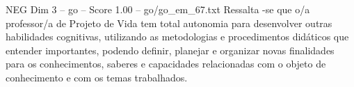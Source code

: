 \begin{textsample}{NEG Dim 3 – go – Score 1.00 – go/go\_em\_67.txt}
Ressalta -se que o/a professor/a de Projeto de Vida tem total autonomia para desenvolver outras habilidades cognitivas, utilizando as metodologias e procedimentos didáticos que entender importantes, podendo definir, planejar e organizar novas finalidades para os conhecimentos, saberes e capacidades relacionadas com o objeto de conhecimento e com os temas trabalhados.

\end{textsample}
